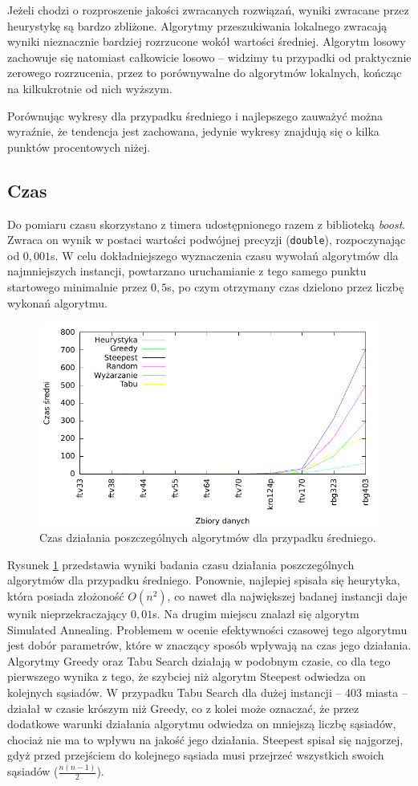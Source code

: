 Jeżeli chodzi o rozproszenie jakości zwracanych rozwiązań, wyniki zwracane przez heurystykę są bardzo zbliżone. Algorytmy przeszukiwania lokalnego zwracają wyniki nieznacznie bardziej rozrzucone wokół wartości średniej. Algorytm losowy zachowuje się natomiast całkowicie losowo -- widzimy tu przypadki od praktycznie zerowego rozrzucenia, przez to porównywalne do algorytmów lokalnych, kończąc na kilkukrotnie od nich wyższym.

Porównując wykresy dla przypadku średniego i najlepszego zauważyć można wyraźnie, że tendencja jest zachowana, jedynie wykresy znajdują się o kilka punktów procentowych niżej.

\subsection{Czas}
Do pomiaru czasu skorzystano z timera udostępnionego razem z biblioteką \emph{boost}. Zwraca on wynik w postaci wartości podwójnej precyzji (\texttt{double}), rozpoczynając od $0,001$s. W celu dokładniejszego wyznaczenia czasu wywołań algorytmów dla najmniejszych instancji, powtarzano uruchamianie z tego samego punktu startowego minimalnie przez $0,5$s, po czym otrzymany czas dzielono przez liczbę wykonań algorytmu.

\begin{figure}[!h]
\centering\includegraphics[width=12cm]{img/czas_avg}
\caption{Czas działania poszczególnych algorytmów dla przypadku średniego.}\label{rys:czas_avg}
\end{figure}

Rysunek \ref{rys:czas_avg} przedstawia wyniki badania czasu działania poszczególnych algorytmów dla przypadku średniego. Ponownie, najlepiej spisała się heurytyka, która posiada złożoność $O(n^2)$, co nawet dla największej badanej instancji daje wynik nieprzekraczający $0,01$s. Na drugim miejscu znalazł się algorytm Simulated Annealing. Problemem w ocenie efektywności czasowej tego algorytmu jest dobór parametrów, które w znaczący sposób wpływają na czas jego działania. Algorytmy Greedy oraz Tabu Search działają w podobnym czasie, co dla tego pierwszego wynika z tego, że szybciej niż algorytm Steepest odwiedza on kolejnych sąsiadów. W przypadku Tabu Search dla dużej instancji -- 403 miasta -- działał w czasie krószym niż Greedy, co z kolei może oznaczać, że przez dodatkowe warunki działania algorytmu odwiedza on mniejszą liczbę sąsiadów, chociaż nie ma to wpływu na jakość jego działania. Steepest spisał się najgorzej, gdyż przed przejściem do kolejnego sąsiada musi przejrzeć wszystkich swoich sąsiadów ($\frac{n(n-1)}{2}$).

